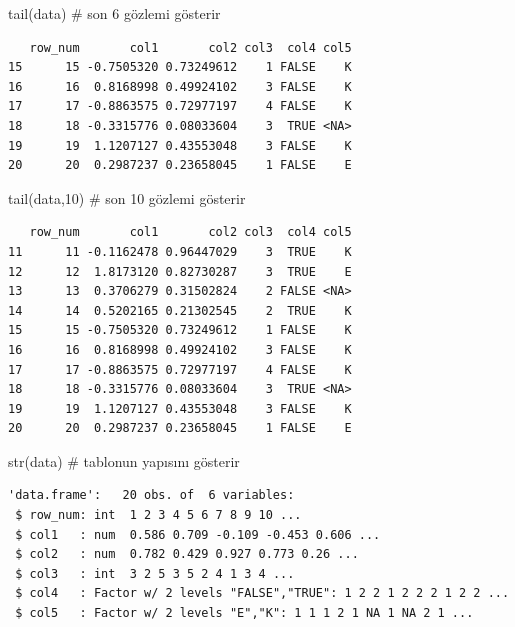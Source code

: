 \documentclass[
  letterpaper,
  DIV=11,
  numbers=noendperiod]{scrreprt}
\newenvironment{Shaded}{\begin{snugshade}}{\end{snugshade}}
\newcommand{\CommentTok}[1]{\textcolor[rgb]{0.37,0.37,0.37}{#1}}
\newcommand{\DecValTok}[1]{\textcolor[rgb]{0.68,0.00,0.00}{#1}}
\newcommand{\FunctionTok}[1]{\textcolor[rgb]{0.28,0.35,0.67}{#1}}
\newcommand{\NormalTok}[1]{\textcolor[rgb]{0.00,0.23,0.31}{#1}}
\begin{document}
\begin{Shaded}
\begin{Highlighting}[]
\FunctionTok{tail}\NormalTok{(data) }\CommentTok{\# son 6 gözlemi gösterir}
\end{Highlighting}
\end{Shaded}

\begin{verbatim}
   row_num       col1       col2 col3  col4 col5
15      15 -0.7505320 0.73249612    1 FALSE    K
16      16  0.8168998 0.49924102    3 FALSE    K
17      17 -0.8863575 0.72977197    4 FALSE    K
18      18 -0.3315776 0.08033604    3  TRUE <NA>
19      19  1.1207127 0.43553048    3 FALSE    K
20      20  0.2987237 0.23658045    1 FALSE    E
\end{verbatim}

\begin{Shaded}
\begin{Highlighting}[]
\FunctionTok{tail}\NormalTok{(data,}\DecValTok{10}\NormalTok{) }\CommentTok{\# son 10 gözlemi gösterir}
\end{Highlighting}
\end{Shaded}

\begin{verbatim}
   row_num       col1       col2 col3  col4 col5
11      11 -0.1162478 0.96447029    3  TRUE    K
12      12  1.8173120 0.82730287    3  TRUE    E
13      13  0.3706279 0.31502824    2 FALSE <NA>
14      14  0.5202165 0.21302545    2  TRUE    K
15      15 -0.7505320 0.73249612    1 FALSE    K
16      16  0.8168998 0.49924102    3 FALSE    K
17      17 -0.8863575 0.72977197    4 FALSE    K
18      18 -0.3315776 0.08033604    3  TRUE <NA>
19      19  1.1207127 0.43553048    3 FALSE    K
20      20  0.2987237 0.23658045    1 FALSE    E
\end{verbatim}

\begin{Shaded}
\begin{Highlighting}[]
\FunctionTok{str}\NormalTok{(data) }\CommentTok{\# tablonun yapısını gösterir}
\end{Highlighting}
\end{Shaded}

\begin{verbatim}
'data.frame':   20 obs. of  6 variables:
 $ row_num: int  1 2 3 4 5 6 7 8 9 10 ...
 $ col1   : num  0.586 0.709 -0.109 -0.453 0.606 ...
 $ col2   : num  0.782 0.429 0.927 0.773 0.26 ...
 $ col3   : int  3 2 5 3 5 2 4 1 3 4 ...
 $ col4   : Factor w/ 2 levels "FALSE","TRUE": 1 2 2 1 2 2 2 1 2 2 ...
 $ col5   : Factor w/ 2 levels "E","K": 1 1 1 2 1 NA 1 NA 2 1 ...
\end{verbatim}
\end{document}
